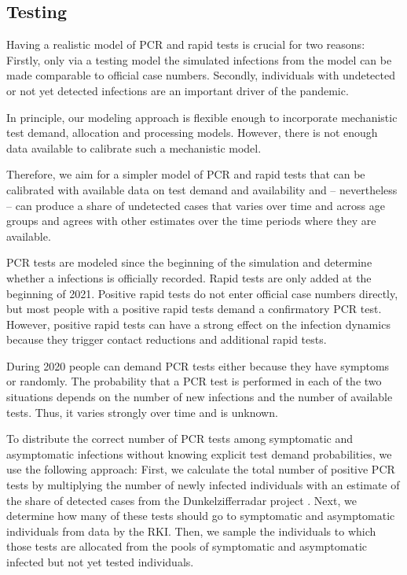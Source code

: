 \subsection{Testing} %
\label{sub:testing}

Having a realistic model of PCR and rapid tests is crucial for two reasons: Firstly,
only via a testing model the simulated infections from the model can be made comparable
to official case numbers. Secondly, individuals with undetected or not yet detected
infections are an important driver of the pandemic.

In principle, our modeling approach is flexible enough to incorporate mechanistic test
demand, allocation and processing models. However, there is not enough data available to
calibrate such a mechanistic model.

Therefore, we aim for a simpler model of PCR and rapid tests that can be calibrated with
available data on test demand and availability and -- nevertheless -- can produce a share
of undetected cases that varies over time and across age groups and agrees with other
estimates over the time periods where they are available.

PCR tests are modeled since the beginning of the simulation and determine whether a
infections is officially recorded. Rapid tests are only added at the beginning of 2021.
Positive rapid tests do not enter official case numbers directly, but most people with a
positive rapid tests demand a confirmatory PCR test. However, positive rapid tests can
have a strong effect on the infection dynamics because they trigger contact reductions
and additional rapid tests.

During 2020 people can demand PCR tests either because they have symptoms or randomly.
The probability that a PCR test is performed in each of the two situations depends on the
number of new infections and the number of available tests. Thus, it varies strongly over
time and is unknown.

To distribute the correct number of PCR tests among symptomatic and asymptomatic
infections without knowing explicit test demand probabilities, we use the following
approach: First, we calculate the total number of positive PCR tests by multiplying the
number of newly infected individuals with an estimate of the share of detected cases
from the Dunkelzifferradar project \citep{Dunkelzifferradar2020}. Next, we determine how
many of these tests should go to symptomatic and asymptomatic individuals from data by
the RKI. Then, we sample the individuals to which those tests
are allocated from the pools of symptomatic and asymptomatic infected but not yet tested
individuals.

